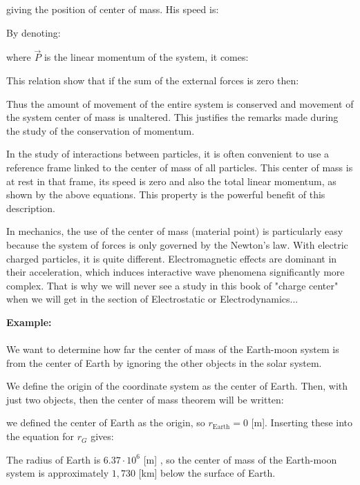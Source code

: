 	giving the position of center of mass. His speed is:
	
	By denoting:
	
	where $\vec{P}$ is the linear momentum of the system, it comes:
	
	This relation show that if the sum of the external forces is zero then:
	
	Thus the amount of movement of the entire system is conserved and movement of the system center of mass is unaltered. This justifies the remarks made during the study of the conservation of momentum.

	In the study of interactions between particles, it is often convenient to use a reference frame linked to the center of mass of all particles. This center of mass is at rest in that frame, its speed is zero and also the total linear momentum, as shown by the above equations. This property is the powerful benefit of this description.
	\begin{tcolorbox}[title=Remark,colframe=black,arc=10pt]
	In mechanics, the use of the center of mass (material point) is particularly easy because the system of forces is only governed by the Newton's law. With electric charged particles, it is quite different. Electromagnetic effects are dominant in their acceleration, which induces interactive wave phenomena significantly more complex. That is why we will never see a study in this book of "charge center" when we will get in the section of Electrostatic or Electrodynamics...
	\end{tcolorbox}
	\begin{tcolorbox}[colframe=black,colback=white,sharp corners]
	\textbf{{\Large {}}Example:}\\\\
	We want to determine how far the center of mass of the Earth-moon system is from the center of Earth by ignoring the other objects in the solar system.

	We define the origin of the coordinate system as the center of Earth. Then, with just two objects, then the center of mass theorem will be written:
	
	we defined the center of Earth as the origin, so $r_{\text{Earth}}=0$ [m]. Inserting these into the equation for $r_G$ gives:
	
	The radius of Earth is $6.37\cdot 10^6$ [m] , so the center of mass of the Earth-moon system is approximately $1,730$ [km] below the surface of Earth.
	\end{tcolorbox}
		
